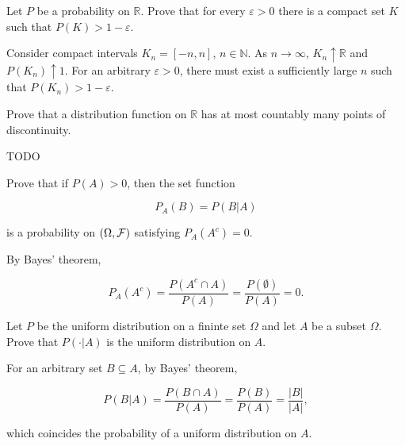 \begin{exercise}
  Let $P$ be a probability on $\mathbb{R}$. Prove that for every $\varepsilon>0$ there is a compact set $K$ such that $P(K)>1-\varepsilon$.
\end{exercise}
\begin{solution}
  Consider compact intervals $K_n=[-n, n]$, $n\in\mathbb{N}$. As $n\to\infty$, $K_n\uparrow \mathbb{R}$ and $P(K_n)\uparrow 1$. For an arbitrary $\varepsilon>0$, there must exist a sufficiently large $n$ such that $P(K_n)>1-\varepsilon$.
\end{solution}

\begin{exercise}
  Prove that a distribution function on $\mathbb{R}$ has at most countably many points of discontinuity.
\end{exercise}
\begin{solution}
  TODO
\end{solution}


\begin{exercise}
  Prove that if $P(A)>0$, then the set function

  \[ P_A(B) = P(B|A) \]

  is a probability on $(\Omega, \cal F)$ satisfying $P_A(A^c)=0$.
\end{exercise}
\begin{solution}
  By Bayes' theorem,

  \[ P_A(A^c) = \frac{P(A^c\cap A)}{P(A)} = \frac{P(\emptyset)}{P(A)} = 0. \]
\end{solution}

\begin{exercise}
  Let $P$ be the uniform distribution on a fininte set $\Omega$ and let $A$ be a subset $\Omega$. Prove that $P(\cdot|A)$ is the uniform distribution on $A$.
\end{exercise}
\begin{solution}
  For an arbitrary set $B\subseteq A$, by Bayes' theorem,

  \[ P(B|A) = \frac{P(B\cap A)}{P(A)} = \frac{P(B)}{P(A)} = \frac{|B|}{|A|}, \]

  which coincides the probability of a uniform distribution on $A$.
\end{solution}


